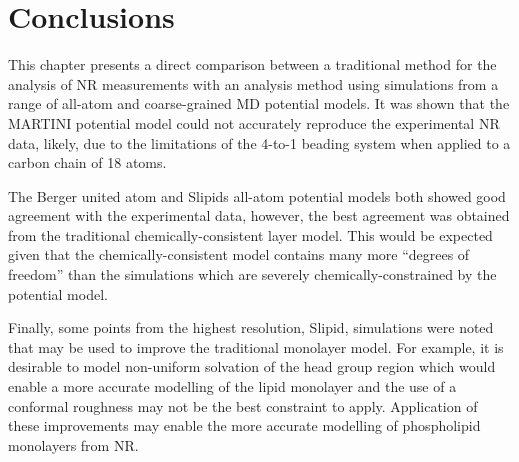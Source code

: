 \section{Conclusions}

This chapter presents a direct comparison between a traditional method for the analysis of NR measurements with an analysis method using simulations from a range of all-atom and coarse-grained MD potential models.
It was shown that the MARTINI potential model could not accurately reproduce the experimental NR data, likely, due to the limitations of the 4-to-1 beading system when applied to a carbon chain of 18 atoms.

The Berger united atom and Slipids all-atom potential models both showed good agreement with the experimental data, however, the best agreement was obtained from the traditional chemically-consistent layer model.
This would be expected given that the chemically-consistent model contains many more ``degrees of freedom'' than the simulations which are severely chemically-constrained by the potential model.

Finally, some points from the highest resolution, Slipid, simulations were noted that may be used to improve the traditional monolayer model.
For example, it is desirable to model non-uniform solvation of the head group region which would enable a more accurate modelling of the lipid monolayer and the use of a conformal roughness may not be the best constraint to apply.
Application of these improvements may enable the more accurate modelling of phospholipid monolayers from NR.
